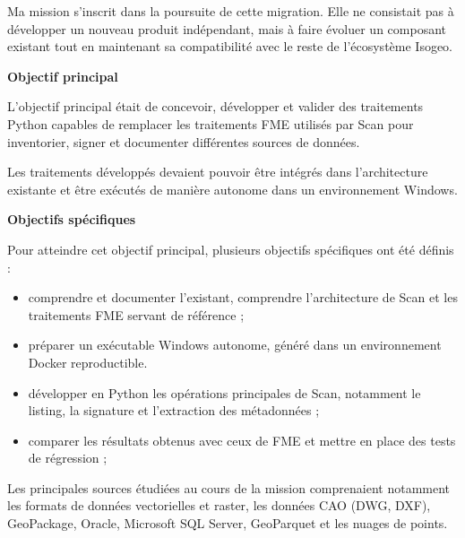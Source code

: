 Ma mission s'inscrit dans la poursuite de cette migration. Elle ne consistait
pas à développer un nouveau produit indépendant, mais à faire évoluer un
composant existant tout en maintenant sa compatibilité avec le reste de
l'écosystème Isogeo.

\medskip

\noindent
\textbf{Objectif principal}

\medskip

L'objectif principal était de concevoir, développer et valider des traitements
Python capables de remplacer les traitements FME utilisés par Scan pour
inventorier, signer et documenter différentes sources de données.

Les traitements développés devaient pouvoir être intégrés dans l'architecture
existante et être exécutés de manière autonome dans un environnement Windows.

\medskip

\noindent
\textbf{Objectifs spécifiques}

\medskip

Pour atteindre cet objectif principal, plusieurs objectifs spécifiques ont été
définis :

\begin{itemize}
\item comprendre et documenter l'existant, comprendre l'architecture de Scan et les traitements FME
servant de référence ;
\item préparer un exécutable Windows autonome, généré dans un environnement
Docker reproductible.
\item développer en Python les opérations principales de Scan, notamment le
listing, la signature et l'extraction des métadonnées ;
\item comparer les résultats obtenus avec ceux de FME et mettre en place des
tests de régression ;
\end{itemize}

Les principales sources étudiées au cours de la mission comprenaient notamment
les formats de données vectorielles et raster, les données CAO (DWG, DXF),
GeoPackage, Oracle, Microsoft SQL Server, GeoParquet et les nuages de points.
